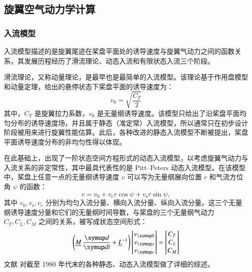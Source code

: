 \subsection{旋翼空气动力学计算}

\subsubsection{入流模型}

入流模型描述的是旋翼尾迹在桨盘平面处的诱导速度与旋翼气动力之间的函数关系，其发展历程经历了滑流理论、动态入流和有限状态入流三个阶段。

滑流理论，又称动量理论，是最早也是最简单的入流模型。该理论基于作用盘模型和动量定理，给出的悬停状态下桨盘平面的诱导速度为：
\begin{equation}
v_{\mathrm{0}}=\sqrt{\frac{C_{T}}{2}}
\end{equation}
其中，$C_{T}$ 是旋翼拉力系数，$v_{\mathrm{0}}$ 是无量纲诱导速度。该模型只给出了沿桨盘平面均匀分布的诱导速度场，并且属于静态（准定常）入流模型，所以通常只在初步设计阶段被用来进行旋翼性能估算。此后，各种改进的静态入流模型不断被提出，桨盘平面诱导速度分布的非均匀性得以体现。

在此基础上，出现了一阶状态空间方程形式的动态入流模型，以考虑旋翼气动力与入流关系的非定常性，其中最具代表性的是 Pitt–Peters
动态入流模型。在该模型中，桨盘上任意一点的无量纲诱导速度 $v$ 可以写为无量纲展向位置 $r$ 和气流方位角 $\psi$
的函数：
\begin{equation}
v=v_{0}+v_{\mathrm{c}}r\cos\psi+v_{\mathrm{s}}r\sin\psi,
\end{equation}
其中 $v_{\mathrm{0}},v_{\mathrm{s}},v_{\mathrm{c}}$ 分别为均匀入流分量、横向入流分量、纵向入流分量。这三个无量纲诱导速度分量和它们的无量纲时间导数，与桨盘的三个无量纲气动力
$C_{T},C_{L},C_{M}$ 之间的关系，被写成状态空间形式：
\begin{equation}
\left(\underline{M}\,\dv{t}+\underline{L}^{-1}\right)\begin{bmatrix}v_{\mathrm{0}}\\
v_{\mathrm{s}}\\
v_{\mathrm{c}}
\end{bmatrix}=\begin{bmatrix}C_{T}\\
C_{L}\\
C_{M}
\end{bmatrix}
\end{equation}
文献 \cite{Chen1989} 对截至 1980 年代末的各种静态、动态入流模型做了详细的综述。

